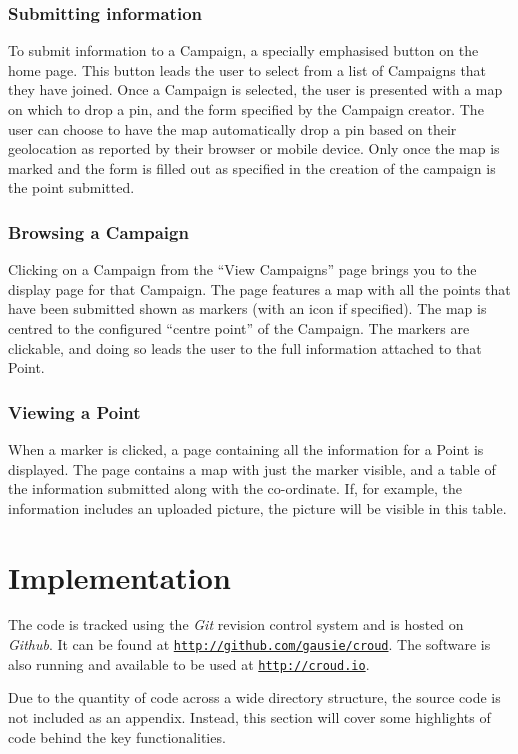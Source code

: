 \documentclass{article}
\newcommand\ssection{\clearpage\section}
\begin{document}
		\subsubsection{Submitting information}
		To submit information to a Campaign, a specially emphasised button on the home page. This button leads the user to select from a list of Campaigns that they have joined. Once a Campaign is selected, the user is presented with a map on which to drop a pin, and the form specified by the Campaign creator. The user can choose to have the map automatically drop a pin based on their geolocation as reported by their browser or mobile device. Only once the map is marked and the form is filled out as specified in the creation of the campaign is the point submitted.

		\subsubsection{Browsing a Campaign}
		Clicking on a Campaign from the ``View Campaigns'' page brings you to the display page for that Campaign. The page features a map with all the points that have been submitted shown as markers (with an icon if specified). The map is centred to the configured ``centre point'' of the Campaign. The markers are clickable, and doing so leads the user to the full information attached to that Point.

		\subsubsection{Viewing a Point}
		When a marker is clicked, a page containing all the information for a Point is displayed. The page contains a map with just the marker visible, and a table of the information submitted along with the co-ordinate. If, for example, the information includes an uploaded picture, the picture will be visible in this table.

	\ssection{Implementation}
	\label{sec:implementation}

		The code is tracked using the \emph{Git} revision control system and is hosted on \emph{Github}. It can be found at \href{http://github.com/gausie/croud}{\nolinkurl{http://github.com/gausie/croud}}. The software is also running and available to be used at \href{http://croud.io}{\nolinkurl{http://croud.io}}.

		Due to the quantity of code across a wide directory structure, the source code is not included as an appendix. Instead, this section will cover some highlights of code behind the key functionalities.
\end{document}
